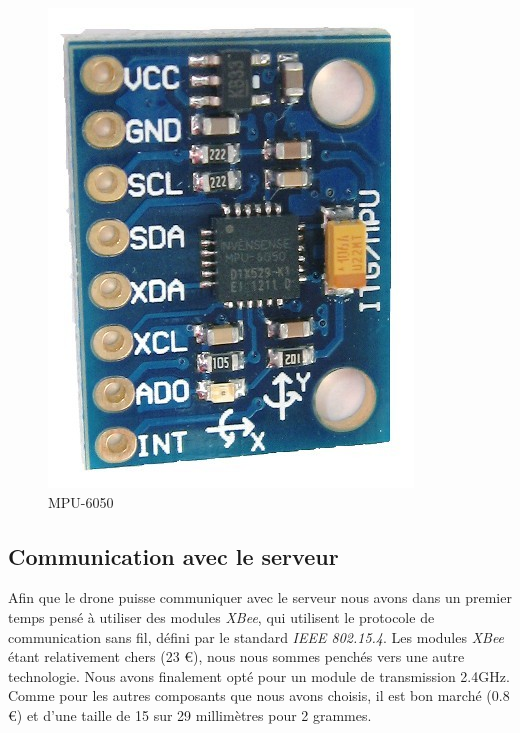 \documentclass[a4paper,10pt]{report}
\begin{document}
	\begin{figure}[htbp]%
	  \centering
	  \includegraphics[scale = 0.2]{img/mpu-6050.jpg}
	  \caption{MPU-6050}
	  \label{mpu6050}
	\end{figure}	
      
      \subsection{Communication avec le serveur}
	Afin que le drone puisse communiquer avec le serveur nous avons dans un premier temps pensé à utiliser des modules \textit{XBee}, 
	qui utilisent le protocole de communication sans fil, défini par le standard \textit{IEEE 802.15.4}. Les modules \textit{XBee} 
	étant relativement chers (23 \euro), nous nous sommes penchés vers une autre technologie. Nous avons finalement opté pour un module
	de transmission 2.4GHz. Comme pour les autres composants que nous avons choisis, il est bon marché (0.8 \euro) et d'une taille de 15 
	sur 29 millimètres pour 2 grammes.
	
\end{document}
